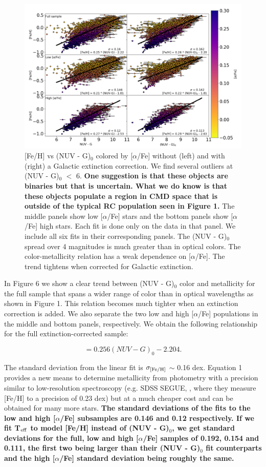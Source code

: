 \documentclass[twocolumn]{emulateapj}
\begin{document}
\begin{figure}[] %
\centering
\includegraphics[width=1\textwidth]{f6.pdf}
\caption{[Fe/H] vs (NUV - G)$_0$ colored by [$\alpha$/Fe] without (left) and with (right) a Galactic extinction correction. We find several outliers at (NUV - G)$_0$ $<$ 6. \textbf{One suggestion is that these objects are binaries but that is uncertain. What we do know is that these objects populate a region in CMD space that is outside of the typical RC population seen in Figure 1.} The middle panels show low [$\alpha$/Fe] stars and the bottom panels show [$\alpha$/Fe] high stars. Each fit is done only on the data in that panel. We include all six fits in their corresponding panels. The (NUV - G)$_0$ spread over 4 magnitudes is much greater than in optical colors. The color-metallicity relation has a weak dependence on [$\alpha$/Fe]. The trend tightens when corrected for Galactic extinction.}
\end{figure}

In Figure 6 we show a clear trend between (NUV - G)$_0$ color and metallicity for the full sample that spans a wider range of color than in optical wavelengths as shown in Figure 1. This relation becomes much tighter when an extinction correction is added. We also separate the two low and high [$\alpha$/Fe] populations in the middle and bottom panels, respectively. We obtain the following relationship for the full extinction-corrected sample:

\begin{equation}
    [Fe/H] = 0.256 (NUV - G)_0 - 2.204.
\end{equation}

The standard deviation from the linear fit is $\sigma_{\rm{[Fe/H]}}$ $\sim$ 0.16 dex. Equation 1 provides a new means to determine metallicity from photometry with a precision similar to low-resolution spectroscopy (e.g. SDSS SEGUE, \citealt{lee2011}, where they measure [Fe/H] to a precision of 0.23 dex) but at a much cheaper cost and can be obtained for many more stars. \textbf{The standard deviations of the fits to the low and high [$\alpha$/Fe] subsamples are 0.146 and 0.12 respectively. If we fit T$_{\rm{eff}}$ to model [Fe/H] instead of (NUV - G)$_0$, we get standard deviations for the full, low and high [$\alpha$/Fe] samples of 0.192, 0.154 and 0.111, the first two being larger than their (NUV - G)$_0$ fit counterparts and the high [$\alpha$/Fe] standard deviation being roughly the same.}
\end{document}
